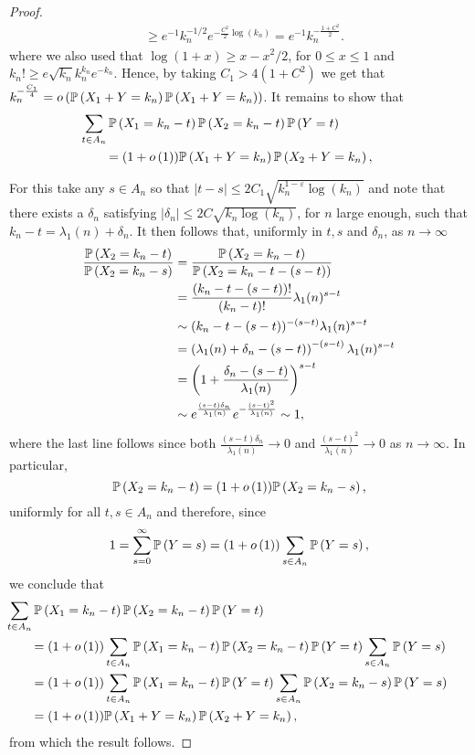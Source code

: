 \begin{proof}
\begin{align*}
	&\ge e^{-1} k_n^{-1/2} e^{ -\frac{C^2}{2} \log(k_n)} = e^{-1} k_n^{-\frac{1+C^2}{2}}.
\end{align*}
where we also used that $\log(1+x) \ge x - x^2/2$, for $0\le x \le 1$ and $k_n! \ge e \sqrt{k_n} k_n^{k_n} e^{-k_n}$. Hence, by taking $C_1 > 4(1 + C^2)$ we get that $k_n^{-\frac{C_1}{4}} = o\left(\mathbb{P}\left(X_1 + Y = k_n\right)\mathbb{P}\left(X_1 + Y = k_n\right)\right)$. It remains to show that 
\begin{align*}
	&\hspace{-20pt}\sum_{t \in A_n} \Prob{X_1 = k_n - t}\Prob{X_2 = k_n - t}\Prob{Y = t}\\
	&= (1 + \smallO{1}) \Prob{X_1 + Y = k_n} \Prob{X_2 + Y = k_n},
\end{align*}

For this take any $s \in A_n$ so that $|t-s| \le 2 C_1 \sqrt{k_n^{1-\varepsilon}\log(k_n)}$ and note that there exists a $\delta_n$ satisfying $|\delta_n| \le 2C \sqrt{k_n \log(k_n)}$, for $n$ large enough, such that $k_n - t = \lambda_1(n) + \delta_n$. It then follows that, uniformly in $t,s$ and $\delta_n$, as $n \to \infty$
\begin{align*}
	\frac{\mathbb{P}\left(X_2 = k_n - t\right)}{\mathbb{P}\left(X_2 = k_n - s\right)}
	&= \frac{\mathbb{P}\left(X_2 = k_n - t\right)}{\mathbb{P}\left(X_2 = k_n - t - (s - t)\right)}\\
	&= \frac{(k_n - t - (s-t))!}{(k_n - t)!} \lambda_1(n)^{s - t} \\
	&\sim (k_n - t - (s-t))^{-(s-t)} \lambda_1(n)^{s-t} \\
	&= \left(\lambda_1(n) + \delta_n - (s-t)\right)^{-(s-t)}\lambda_1(n)^{s-t}\\
	&= \left(1 + \frac{\delta_n -(s-t)}{\lambda_1(n)}\right)^{s-t}\\
	&\sim e^{\frac{(s-t)\delta_n}{\lambda_1(n)}} e^{-\frac{(s-t)^2}{\lambda_1(n)}} \sim 1,
\end{align*}
where the last line follows since both $\frac{(s-t)\delta_n}{\lambda_1(n)} \to 0$ and $\frac{(s-t)^2}{\lambda_1(n)} \to 0$ as $n \to \infty$. In particular,
\[
	\mathbb{P}\left(X_2 = k_n - t\right) = (1+o\left(1\right)) \mathbb{P}\left(X_2 = k_n - s\right),
\] 
uniformly for all $t, s \in A_n$ and therefore, since
\[
	1 = \sum_{s = 0}^\infty \mathbb{P}\left(Y = s\right) = (1+o\left(1\right)) \sum_{s \in A_n} \mathbb{P}\left(Y = s\right),
\]
we conclude that
\begin{align*}
	&\hspace{-20pt}\sum_{t \in A_n} \Prob{X_1 = k_n - t}\Prob{X_2 = k_n - t}\Prob{Y = t}\\
	&= (1+\smallO{1}) \sum_{t \in A_n} \Prob{X_1 = k_n - t}\Prob{X_2 = k_n - t}\Prob{Y = t} \sum_{s \in A_n} \Prob{Y = s}\\
	&= (1 + \smallO{1}) \sum_{t \in A_n} \Prob{X_1 = k_n - t}\Prob{Y = t} 
		\sum_{s \in A_n} \Prob{X_2 = k_n - s} \Prob{Y = s}\\
	&= (1 + \smallO{1}) \Prob{X_1 + Y = k_n} \Prob{X_2 + Y = k_n},
\end{align*}
from which the result follows.
\end{proof}


